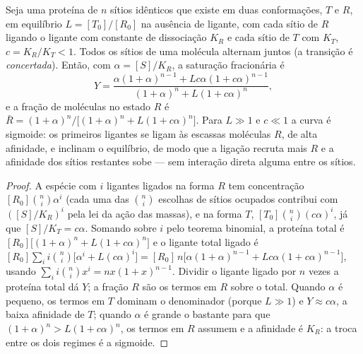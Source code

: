 \begin{theorem}\label{thm:b3:structural-biology:mwc}
Seja uma proteína de $n$ sítios idênticos que existe em duas
conformações, $T$ e $R$, em equilíbrio $L = [T_{0}]/[R_{0}]$ na
ausência de ligante, com cada sítio de $R$ ligando o ligante com
constante de dissociação $K_{R}$ e cada sítio de $T$ com $K_{T}$,
$c = K_{R}/K_{T} < 1$. Todos os sítios de uma molécula alternam juntos
(a transição é \emph{concertada}). Então, com $\alpha = [S]/K_{R}$, a
saturação fracionária é
\[
Y = \frac{\alpha(1+\alpha)^{n-1} + Lc\alpha(1+c\alpha)^{n-1}}
{(1+\alpha)^{n} + L(1+c\alpha)^{n}},
\]
e a fração de moléculas no estado $R$ é $\bar R =
(1+\alpha)^{n}/\bigl[(1+\alpha)^{n} + L(1+c\alpha)^{n}\bigr]$. Para $L
\gg 1$ e $c \ll 1$ a curva é sigmoide: os primeiros ligantes se ligam
às escassas moléculas $R$, de alta afinidade, e inclinam o equilíbrio,
de modo que a ligação recruta mais $R$ e a afinidade dos sítios
restantes sobe ---  sem interação direta alguma entre os
sítios.
\end{theorem}
\begin{proof}
A espécie com $i$ ligantes ligados na forma $R$ tem concentração
$[R_{0}]\binom{n}{i}\alpha^{i}$ (cada uma das $\binom{n}{i}$ escolhas
de sítios ocupados contribui com $([S]/K_{R})^{i}$ pela lei da ação das
massas), e na forma $T$, $[T_{0}]\binom{n}{i}(c\alpha)^{i}$, já que
$[S]/K_{T} = c\alpha$. Somando sobre $i$ pelo teorema binomial, a
proteína total é $[R_{0}]\bigl[(1+\alpha)^{n} + L(1+c\alpha)^{n}\bigr]$
e o ligante total ligado é $[R_{0}]\sum_{i} i\binom{n}{i}\bigl[
\alpha^{i} + L(c\alpha)^{i}\bigr] = [R_{0}]\,n\bigl[\alpha(1+\alpha)^{n-1}
+ Lc\alpha(1+c\alpha)^{n-1}\bigr]$, usando $\sum_{i} i\binom{n}{i}x^{i} =
nx(1+x)^{n-1}$. Dividir o ligante ligado por $n$ vezes a proteína total
dá $Y$; a fração $R$ são os termos em $R$ sobre o total. Quando
$\alpha$ é pequeno, os termos em $T$ dominam o denominador (porque
$L \gg 1$) e $Y \approx c\alpha$, a baixa afinidade de $T$; quando
$\alpha$ é grande o bastante para que
$(1+\alpha)^{n} > L(1+c\alpha)^{n}$, os termos em $R$ assumem e a
afinidade é $K_{R}$: a troca entre os dois regimes é a sigmoide.
\end{proof}

